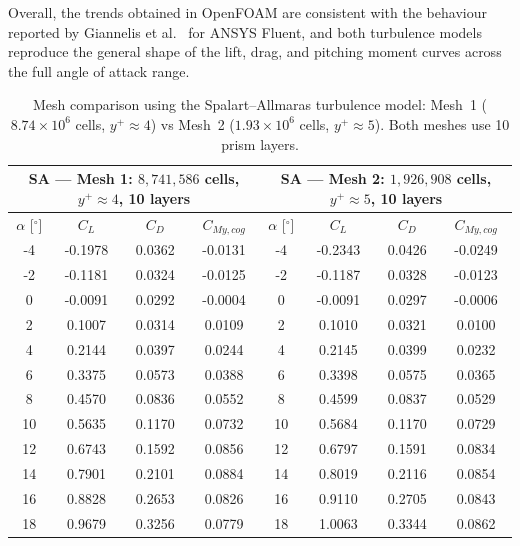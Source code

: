 Overall, the trends obtained in OpenFOAM are consistent with the behaviour reported by Giannelis et al.~\cite{Giannelis2023SSAMGen5} for ANSYS Fluent, and both turbulence models reproduce the general shape of the lift, drag, and pitching moment curves across the full angle of attack range.


\begin{table}[!ht]
\centering
\caption{Mesh comparison using the Spalart--Allmaras turbulence model: Mesh~1 ($8.74\times10^{6}$ cells, $y^{+}\approx 4$) vs Mesh~2 ($1.93\times10^{6}$ cells, $y^{+}\approx 5$). Both meshes use 10 prism layers.}
\label{tab:mesh_SA}
\setlength{\tabcolsep}{6pt}
\renewcommand{\arraystretch}{1.15}
\begin{tabular}{c c c c | c c c c}
\hline
\multicolumn{4}{c|}{\textbf{SA --- Mesh 1: $8{,}741{,}586$ cells, $y^{+}\approx 4$, 10 layers}} &
\multicolumn{4}{c}{\textbf{SA --- Mesh 2: $1{,}926{,}908$ cells, $y^{+}\approx 5$, 10 layers}}\\
\hline
$\alpha$ [$^\circ$] & $C_L$ & $C_D$ & $C_{My,cog}$ &
$\alpha$ [$^\circ$] & $C_L$ & $C_D$ & $C_{My,cog}$\\
\hline
-4 & -0.1978 & 0.0362 & -0.0131 & -4 & -0.2343 & 0.0426 & -0.0249 \\
-2 & -0.1181 & 0.0324 & -0.0125 & -2 & -0.1187 & 0.0328 & -0.0123 \\
0  & -0.0091 & 0.0292 & -0.0004 & 0  & -0.0091 & 0.0297 & -0.0006 \\
2  & 0.1007  & 0.0314 & 0.0109  & 2  & 0.1010  & 0.0321 & 0.0100 \\
4  & 0.2144  & 0.0397 & 0.0244  & 4  & 0.2145  & 0.0399 & 0.0232 \\
6  & 0.3375  & 0.0573 & 0.0388  & 6  & 0.3398  & 0.0575 & 0.0365 \\
8  & 0.4570  & 0.0836 & 0.0552  & 8  & 0.4599  & 0.0837 & 0.0529 \\
10 & 0.5635  & 0.1170 & 0.0732  & 10 & 0.5684  & 0.1170 & 0.0729 \\
12 & 0.6743  & 0.1592 & 0.0856  & 12 & 0.6797  & 0.1591 & 0.0834 \\
14 & 0.7901  & 0.2101 & 0.0884  & 14 & 0.8019  & 0.2116 & 0.0854 \\
16 & 0.8828  & 0.2653 & 0.0826  & 16 & 0.9110  & 0.2705 & 0.0843 \\
18 & 0.9679  & 0.3256 & 0.0779  & 18 & 1.0063  & 0.3344 & 0.0862 \\

\end{tabular}
\end{table}

